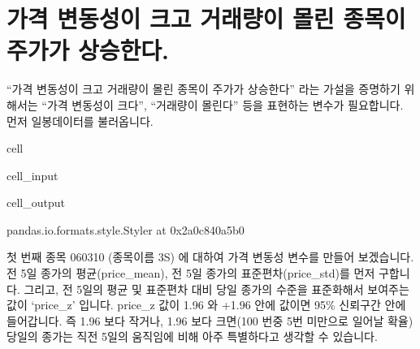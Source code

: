 \documentclass[letterpaper,10pt,english]{jupyterBook}
\begin{document}
\section{가격 변동성이 크고 거래량이 몰린 종목이 주가가 상승한다.}
\label{\detokenize{chapter5/5.1.1_Hypothesis_1:id1}}\label{\detokenize{chapter5/5.1.1_Hypothesis_1::doc}}
\sphinxAtStartPar
“가격 변동성이 크고 거래량이 몰린 종목이 주가가 상승한다” 라는 가설을 증명하기 위해서는 “가격 변동성이 크다”, “거래량이 몰린다” 등을 표현하는 변수가 필요합니다. 먼저 일봉데이터를 불러옵니다.

\begin{sphinxuseclass}{cell}\begin{sphinxVerbatimInput}

\begin{sphinxuseclass}{cell_input}
\begin{sphinxVerbatim}[commandchars=\\\{\}]
  
\end{sphinxVerbatim}

\end{sphinxuseclass}\end{sphinxVerbatimInput}
\begin{sphinxVerbatimOutput}

\begin{sphinxuseclass}{cell_output}
\begin{sphinxVerbatim}[commandchars=\\\{\}]
\PYGZlt{}pandas.io.formats.style.Styler at 0x2a0c840a5b0\PYGZgt{}
\end{sphinxVerbatim}

\end{sphinxuseclass}\end{sphinxVerbatimOutput}

\end{sphinxuseclass}
\sphinxAtStartPar
첫 번째 종목 060310 (종목이름 3S) 에 대하여 가격 변동성 변수를 만들어 보겠습니다. 전 5일 종가의 평균(price\_mean), 전 5일 종가의 표준편차(price\_std)를 먼저 구합니다. 그리고, 전 5일의 평균 및 표준편차 대비 당일 종가의 수준을 표준화해서 보여주는 값이 ‘price\_z’ 입니다. price\_z 값이 \sphinxhyphen{}1.96 와 +1.96 안에 값이면 95\% 신뢰구간 안에 들어갑니다. 즉 \sphinxhyphen{}1.96 보다 작거나, 1.96 보다 크면(100 번중 5번 미만으로 일어날 확율) 당일의 종가는 직전 5일의 움직임에 비해 아주 특별하다고 생각할 수 있습니다.
\end{document}
